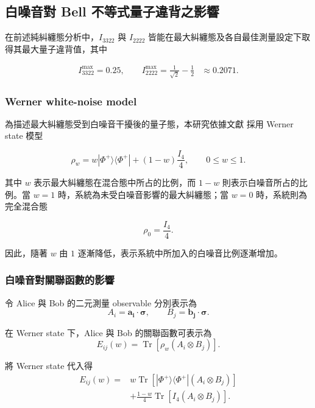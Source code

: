 \documentclass[12pt, a4paper, twoside, reqno]{article}
\begin{document}
\subsection{白噪音對 Bell 不等式量子違背之影響}

在前述純糾纏態分析中，$I_{3322}$ 與 $I_{2222}$ 皆能在最大糾纏態及各自最佳測量設定下取得其最大量子違背值，其中

\[
\begin{aligned}
I_{3322}^{\max}=0.25,\qquad
I_{2222}^{\max}=\frac{1}{\sqrt2}-\frac{1}{2}&\approx 0.2071.
\end{aligned}
\]


\subsubsection{Werner white-noise model}

為描述最大糾纏態受到白噪音干擾後的量子態，本研究依據文獻 \cite{Brunner2008} 採用 Werner state 模型

\begin{equation}
\rho_w
=
w|\Phi^+\rangle\langle\Phi^+|
+
(1-w)\frac{I_4}{4},
\qquad
0\leq w\leq 1.
\end{equation}

\noindent 其中 $w$ 表示最大糾纏態在混合態中所占的比例，而 $1-w$ 則表示白噪音所占的比例。當 $w=1$ 時，系統為未受白噪音影響的最大糾纏態；當 $w=0$ 時，系統則為完全混合態

\[
\rho_0=\frac{I_4}{4}.
\]

\noindent 因此，隨著 $w$ 由 $1$ 逐漸降低，表示系統中所加入的白噪音比例逐漸增加。

\subsubsection{白噪音對關聯函數的影響}

令 Alice 與 Bob 的二元測量 observable 分別表示為
\[
A_i=\bm{a_i}\cdot\bm{\sigma},
\qquad
B_j=\bm{b_j}\cdot\bm{\sigma}.
\]

\noindent 在 Werner state 下，Alice 與 Bob 的關聯函數可表示為
\begin{equation}
E_{ij}(w)
=
\operatorname{Tr}
\left[
\rho_w(A_i\otimes B_j)
\right].
\end{equation}

\noindent 將 Werner state 代入得
\[
\begin{aligned}
E_{ij}(w)
={}&
w\operatorname{Tr}
\left[
|\Phi^+\rangle\langle\Phi^+|
(A_i\otimes B_j)
\right]
\\
&+
\frac{1-w}{4}
\operatorname{Tr}
\left[
I_4(A_i\otimes B_j)
\right].
\end{aligned}
\]
\end{document}
